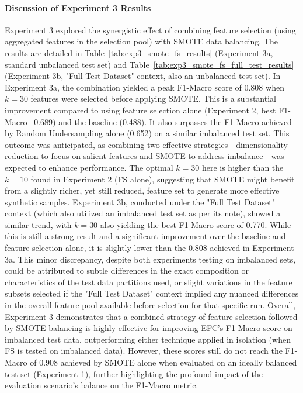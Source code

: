 \documentclass[12pt]{article}
\begin{document}
\paragraph{Discussion of Experiment 3 Results}
Experiment 3 explored the synergistic effect of combining feature selection (using aggregated features in the selection pool)
with SMOTE data balancing. The results are detailed in Table~\ref{tab:exp3_smote_fs_results} (Experiment 3a, standard unbalanced
test set) and Table~\ref{tab:exp3_smote_fs_full_test_results} (Experiment 3b, "Full Test Dataset" context, also an unbalanced
test set). In Experiment 3a, the combination yielded a peak F1-Macro score of 0.808 when $k=30$ features were selected before
applying SMOTE. This is a substantial improvement compared to using feature selection alone (Experiment 2, best F1-Macro ~0.689)
and the baseline (0.488). It also surpasses the F1-Macro achieved by Random Undersampling alone (0.652) on a similar imbalanced
test set. This outcome was anticipated, as combining two effective strategies—dimensionality reduction to focus on salient
features and SMOTE to address imbalance—was expected to enhance performance. The optimal $k=30$ here is higher than the $k=10$
found in Experiment 2 (FS alone), suggesting that SMOTE might benefit from a slightly richer, yet still reduced, feature
set to generate more effective synthetic samples. Experiment 3b, conducted under the "Full Test Dataset" context (which
also utilized an imbalanced test set as per its note), showed a similar trend, with $k=30$ also yielding the best F1-Macro
score of 0.770. While this is still a strong result and a significant improvement over the baseline and feature selection
alone, it is slightly lower than the 0.808 achieved in Experiment 3a. This minor discrepancy, despite both experiments
testing on imbalanced sets, could be attributed to subtle differences in the exact composition or characteristics of the
test data partitions used, or slight variations in the feature subsets selected if the "Full Test Dataset" context implied
any nuanced differences in the overall feature pool available before selection for that specific run.
Overall, Experiment 3 demonstrates that a combined strategy of feature selection followed by SMOTE balancing is highly
effective for improving EFC's F1-Macro score on imbalanced test data, outperforming either technique applied in isolation
(when FS is tested on imbalanced data). However, these scores still do not reach the F1-Macro of 0.908 achieved by SMOTE
alone when evaluated on an ideally balanced test set (Experiment 1), further highlighting the profound impact of the
evaluation scenario's balance on the F1-Macro metric.
\end{document}
